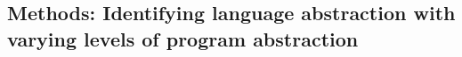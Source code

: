 \documentclass[10pt,letterpaper]{article}
\begin{document}




\subsection{Methods: Identifying language abstraction with varying levels of program abstraction}
\end{document}
